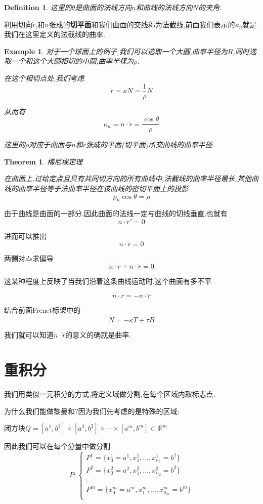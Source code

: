 \documentclass[11pt,hyperref,a4paper,UTF8]{ctexart}
\newtheorem{theorem}{Theorem}[subsection]
\newtheorem{example}{Example}[subsection]
\newtheorem{definition}{Definition}[subsection]
\newcommand{\RR}{\mathbb{R}}
\begin{document}
\begin{CJK}{UTF8}{gkai}
\begin{definition}
这里的$\theta$是曲面的法线方向$n$和曲线的法线方向$N$的夹角.\\
\end{definition}

利用切向$\dot{r}$,和$n$张成的\textbf{切平面}和我们曲面的交线称为法截线,前面我们表示的$\kappa_n$就是我们在这里定义的法截线的曲率.\\

\begin{example}
  对于一个球面上的例子,我们可以选取一个大圆,曲率半径为$R$,同时选取一个和这个大圆相切的小圆,曲率半径为$\rho$.

  在这个相切点处,我们考虑
  \[\ddot{r} = \kappa N = \frac{1}{\rho} N\]

  从而有
  \[\kappa_n = n \cdot \ddot{r} = \frac{\cos \theta}{\rho}\]

  这里的$\rho$对应于曲面与$n$和$\dot{r}$张成的平面(切平面)所交曲线的曲率半径.
\end{example}

\begin{theorem}
  梅尼埃定理

  在曲面上,过给定点且具有共同切方向的所有曲线中,法截线的曲率半径最长,其他曲线的曲率半径等于法曲率半径在该曲线的密切平面上的投影
  \[\rho_n \cos \theta = \rho\]
\end{theorem}
由于曲线是曲面的一部分,因此曲面的法线一定与曲线的切线垂直,也就有
\[n \cdot r' = 0\]

进而可以推出
\[n \cdot \dot{r} = 0\]

两侧对$ds$求偏导
\[\dot{n} \cdot \dot{r} + n \cdot \ddot{r} = 0\]

这某种程度上反映了当我们沿着这条曲线运动时,这个曲面有多不平

\[\dot{n} \cdot \dot{r} = - n \cdot \ddot{r}\]

结合前面Frenet标架中的
\[\dot{N} = - \kappa T + \tau B\]

我们就可以知道$\dot{n}\cdot \dot{r}$的意义的确就是曲率.

\section{重积分}

我们用类似一元积分的方式,将定义域做分割,在每个区域内取标志点.

为什么我们能做黎曼和?因为我们先考虑的是特殊的区域:

闭方块$Q = [a^1,b^1] \times [a^2,b^2] \times \cdots\times [a^m,b^m] \subset \RR^m$

因此我们可以在每个分量中做分割
\[P:\begin{cases}
  P^1 = \{x_0^1 = a^1,x_1^1,\ldots,x_{n_1}^1 = b^1\}\\
  P^2 = \{x_0^2 = a^2,x_1^2,\ldots,x_{n_2}^2 = b^2\}\\
  \vdots\\
  P^m = \{x_0^m = a^m,x_1^m,\ldots,x_{n_m}^m = b^m\}\\
\end{cases}\]


\end{CJK}
\end{document}
